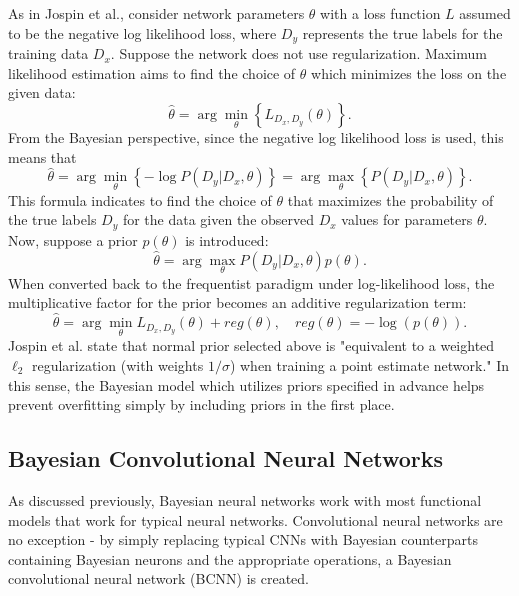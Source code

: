 \documentclass[12pt]{article}
\begin{document}
As in Jospin et al., consider network parameters $\theta$ with a loss function $L$ assumed to be the negative log likelihood loss, where $D_y$ represents the true labels for the training data $D_x$. Suppose the network does not use regularization. Maximum likelihood estimation aims to find the choice of $\theta$ which minimizes the loss on the given data:
$$
\hat{\theta} = \arg \min_{\theta} \left\{ L_{D_x, D_y} (\theta) \right\}.
$$
From the Bayesian perspective, since the negative log likelihood loss is used, this means that
$$
\hat{\theta} = \arg \min_{\theta} \left\{- \log P(D_y|D_x, \theta) \right\} = \arg \max_{\theta} \left\{ P(D_y|D_x, \theta) \right\}.
$$
This formula indicates to find the choice of $\theta$ that maximizes the probability of the true labels $D_y$ for the data given the observed $D_x$ values for parameters $\theta$. Now, suppose a prior $p(\theta)$ is introduced:
$$
\hat{\theta} = \arg \max_{\theta} P(D_y|D_x, \theta) p(\theta).
$$
When converted back to the frequentist paradigm under log-likelihood loss, the multiplicative factor for the prior becomes an additive regularization term:
$$
\hat{\theta} = \arg \min_{\theta} L_{D_x, D_y} (\theta) + reg(\theta), \quad reg(\theta) = -\log(p(\theta)).
$$
Jospin et al. state that normal prior selected above is "equivalent to a weighted $\ell_2$ regularization (with weights $1/\sigma$) when training a point estimate network." In this sense, the Bayesian model which utilizes priors specified in advance helps prevent overfitting simply by including priors in the first place. 





\subsection{Bayesian Convolutional Neural Networks}

As discussed previously, Bayesian neural networks work with most functional models that work for typical neural networks. Convolutional neural networks are no exception - by simply replacing typical CNNs with Bayesian counterparts containing Bayesian neurons and the appropriate operations, a Bayesian convolutional neural network (BCNN) is created. 
\end{document}

